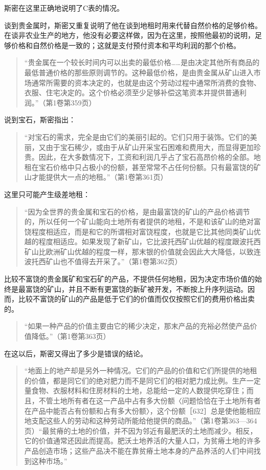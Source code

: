 斯密在这里正确地说明了C表的情况。

谈到贵金属时，斯密又重复说明了他在谈到地租时用来代替自然价格的足够价格。在谈非农业生产的地方，他没有必要这样做，因为在这里，按照他最初的说明，足够价格和自然价格是一致的；这就是支付预付资本和平均利润的那个价格。

\begin{quote}{“贵金属在一个较长时间内可以出卖的最低价格……是由决定其他所有商品的最低普通价格的那些原则调节的。这种最低价格，是由贵金属从矿山进入市场通常所需要的资本决定的，也就是由这个劳动过程中通常所消费的食物、衣服、住宅决定的。这个价格必须至少足够补偿这笔资本并提供普通利润。”（第1卷第359页）}\end{quote}

说到宝石，斯密指出：

\begin{quote}{“对宝石的需求，完全是由它们的美丽引起的。它们只用于装饰。它们的美丽，又由于宝石稀少，或由于从矿山开采宝石困难和费用大，而显得更加珍贵。因此，在大多数情况下，工资和利润几乎占了宝石高昂价格的全部。地租在宝石价格中只占极小的份额，甚至常常不占任何份额。只有最富饶的矿山才能提供大一点的地租。”（第1卷第361页）}\end{quote}

这里只可能产生级差地租：

\begin{quote}{“因为全世界的贵金属和宝石的价格，是由最富饶的矿山的产品价格调节的，所以任何一个矿山能向土地所有者提供的地租，不是和该矿山的绝对富饶程度相适应，而是和它的所谓相对富饶程度，也就是它比其他同类矿山优越的程度相适应。如果发现了新矿山，它比波托西矿山优越的程度跟波托西矿山比欧洲矿山优越的程度一样，那末银的价值就会因此大大降低，以致连波托西矿山也不值得去开采了。”（第1卷第362页）}\end{quote}

比较不富饶的贵金属矿和宝石矿的产品，不提供任何地租，因为决定市场价值的始终是最富饶的矿山，并且不断有更富饶的新矿被开发，不断按上升序列运动。因而，比较不富饶的矿山的产品是低于它们的价值而仅仅按照它们的费用价格出卖的。

\begin{quote}{“如果一种产品的价值主要由它的稀少决定，那末产品的充裕必然使产品价值降低。”（第1卷第363页）}\end{quote}

在这以后，斯密又得出了多少是错误的结论。

\begin{quote}{“地面上的地产却是另外一种情况。它们的产品的价值和它们所提供的地租的价值，都是同它们的绝对肥力而不是同它们的相对肥力成比例。生产一定量食物、衣服材料和住房材料的土地，总能给一定的人数提供吃穿住；而且，不管土地所有者在这一产品中占有多大份额〈问题恰恰在于土地所有者在产品中能否占有份额和占有多大份额〉，这个份额［632］总是使他能相应地支配这些人的劳动和这种劳动所能给他提供的商品。”（第1卷第363—364页）“最贫瘠的土地的价值，并不因为邻近有最肥沃的土地而减少。相反，它的价值通常还因此而提高。肥沃土地养活的大量人口，为贫瘠土地的许多产品创造市场；这些产品决不能在靠贫瘠土地本身的产品养活的人们中间找到这种市场。”}\end{quote}

